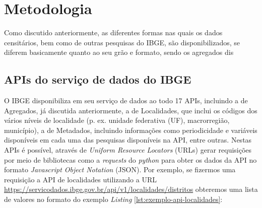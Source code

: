 \chapter{Metodologia}

    

    Como discutido anteriormente, as diferentes formas nas quais os dados censitários, bem como de outras pesquisas do IBGE, são disponibilizados, se diferem basicamente quanto ao seu grão e formato, sendo os agregados dis



    

\section{APIs do serviço de dados do IBGE}

    O IBGE disponibiliza em seu serviço de dados ao todo 17 APIs, incluindo a de Agregados, já discutida anteriormente, a de Localidades, que inclui os códigos dos vários níveis de localidade (p. ex. unidade federativa (UF), macrorregião, município), a de Metadados, incluindo informações como periodicidade e variáveis disponíveis em cada uma das pesquisas disponíveis na API, entre outras. Nestas APIs é possível, através de \textit{Uniform Resource Locators} (URLs) gerar requisições por meio de bibliotecas como a \textit{requests} do \textit{python} para obter os dados da API no formato \textit{Javascript Object Notation} (JSON). Por exemplo, se fizermos uma requisição a API de localidades utilizando a URL \url{https://servicodados.ibge.gov.br/api/v1/localidades/distritos} obteremos uma lista de valores no formato do exemplo \textit{Listing} \ref{lst:exemplo-api-localidades}:

    


    \bigskip
    

